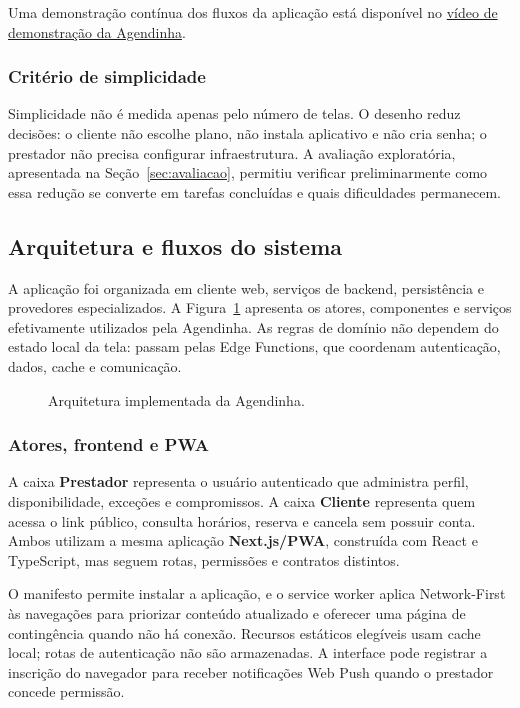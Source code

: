Uma demonstração contínua dos fluxos da aplicação está disponível no \href{https://drive.google.com/drive/folders/1Iy3Y8jWdIG8WkwKIMk8nMqgSO8XAoJEi?usp=sharing}{vídeo de demonstração da Agendinha}.

\subsubsection{Critério de simplicidade}

Simplicidade não é medida apenas pelo número de telas. O desenho reduz decisões: o cliente não escolhe plano, não instala aplicativo e não cria senha; o prestador não precisa configurar infraestrutura. A avaliação exploratória, apresentada na Seção~\ref{sec:avaliacao}, permitiu verificar preliminarmente como essa redução se converte em tarefas concluídas e quais dificuldades permanecem.

\subsection{Arquitetura e fluxos do sistema}

A aplicação foi organizada em cliente web, serviços de backend, persistência e provedores especializados. A Figura~\ref{fig:arquitetura} apresenta os atores, componentes e serviços efetivamente utilizados pela Agendinha. As regras de domínio não dependem do estado local da tela: passam pelas Edge Functions, que coordenam autenticação, dados, cache e comunicação.

\begin{figure}[htbp]
    \centering
    \resizebox{\textwidth}{!}{}
    \caption{Arquitetura implementada da Agendinha.}
    \label{fig:arquitetura}
    \fontepropria
\end{figure}

\subsubsection{Atores, frontend e PWA}

A caixa \textbf{Prestador} representa o usuário autenticado que administra perfil, disponibilidade, exceções e compromissos. A caixa \textbf{Cliente} representa quem acessa o link público, consulta horários, reserva e cancela sem possuir conta. Ambos utilizam a mesma aplicação \textbf{Next.js/PWA}, construída com React e TypeScript, mas seguem rotas, permissões e contratos distintos.

O manifesto permite instalar a aplicação, e o service worker aplica Network-First às navegações para priorizar conteúdo atualizado e oferecer uma página de contingência quando não há conexão. Recursos estáticos elegíveis usam cache local; rotas de autenticação não são armazenadas. A interface pode registrar a inscrição do navegador para receber notificações Web Push quando o prestador concede permissão.

